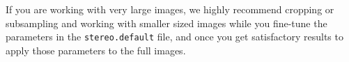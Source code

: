 If you are working with very large images, we highly recommend
cropping or subsampling and working with smaller sized images while
you fine-tune the parameters in the \texttt{stereo.default} file,
and once you get satisfactory results to apply those parameters to
the full images.





